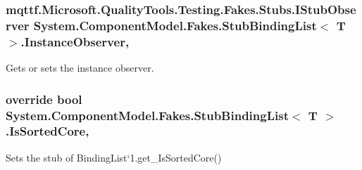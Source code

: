 \hypertarget{class_system_1_1_component_model_1_1_fakes_1_1_stub_binding_list_3_01_t_01_4_a7ed54976963e4f7f3ddd7f4910ec181a}{
\subsubsection[{Instance\-Observer}]{\setlength{\rightskip}{0pt plus 5cm}mqttf.\-Microsoft.\-Quality\-Tools.\-Testing.\-Fakes.\-Stubs.\-I\-Stub\-Observer System.\-Component\-Model.\-Fakes.\-Stub\-Binding\-List$<$ T $>$.Instance\-Observer\hspace{0.3cm}{\ttfamily [get]}, {\ttfamily [set]}}}\label{class_system_1_1_component_model_1_1_fakes_1_1_stub_binding_list_3_01_t_01_4_a7ed54976963e4f7f3ddd7f4910ec181a}


Gets or sets the instance observer.

\hypertarget{class_system_1_1_component_model_1_1_fakes_1_1_stub_binding_list_3_01_t_01_4_ae6ffe167e76245a7e2af08f3d26597f0}{
\subsubsection[{Is\-Sorted\-Core}]{\setlength{\rightskip}{0pt plus 5cm}override bool System.\-Component\-Model.\-Fakes.\-Stub\-Binding\-List$<$ T $>$.Is\-Sorted\-Core\hspace{0.3cm}{\ttfamily [get]}, {\ttfamily [protected]}}}\label{class_system_1_1_component_model_1_1_fakes_1_1_stub_binding_list_3_01_t_01_4_ae6ffe167e76245a7e2af08f3d26597f0}


Sets the stub of Binding\-List`1.get\-\_\-\-Is\-Sorted\-Core()

